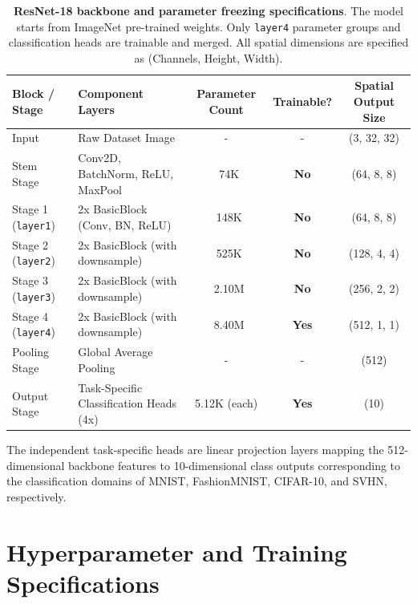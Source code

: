 \documentclass{article}
\theoremstyle{plain}
\theoremstyle{definition}
\theoremstyle{remark}
\begin{document}
\begin{table}[h]
\centering
\caption{\textbf{ResNet-18 backbone and parameter freezing specifications}. The model starts from ImageNet pre-trained weights. Only \texttt{layer4} parameter groups and classification heads are trainable and merged. All spatial dimensions are specified as (Channels, Height, Width).}
\label{tab:app_architecture}
\vskip 0.15in
\begin{small}
\begin{sc}
\begin{tabular}{llccc}
\toprule
Block / Stage & Component Layers & Parameter Count & Trainable? & Spatial Output Size \\
\midrule
Input & Raw Dataset Image & - & - & (3, 32, 32) \\
\midrule
Stem Stage & Conv2D, BatchNorm, ReLU, MaxPool & ~74K & \textbf{No} & (64, 8, 8) \\
\midrule
Stage 1 (\texttt{layer1}) & 2x BasicBlock (Conv, BN, ReLU) & ~148K & \textbf{No} & (64, 8, 8) \\
\midrule
Stage 2 (\texttt{layer2}) & 2x BasicBlock (with downsample) & ~525K & \textbf{No} & (128, 4, 4) \\
\midrule
Stage 3 (\texttt{layer3}) & 2x BasicBlock (with downsample) & ~2.10M & \textbf{No} & (256, 2, 2) \\
\midrule
Stage 4 (\texttt{layer4}) & 2x BasicBlock (with downsample) & ~8.40M & \textbf{Yes} & (512, 1, 1) \\
\midrule
Pooling Stage & Global Average Pooling & - & - & (512) \\
\midrule
Output Stage & Task-Specific Classification Heads (4x) & 5.12K (each) & \textbf{Yes} & (10) \\
\bottomrule
\end{tabular}
\end{sc}
\end{small}
\end{table}

The independent task-specific heads are linear projection layers mapping the 512-dimensional backbone features to 10-dimensional class outputs corresponding to the classification domains of MNIST, FashionMNIST, CIFAR-10, and SVHN, respectively.

\section{Hyperparameter and Training Specifications}
\label{sec:hyperparameters}
\end{document}
